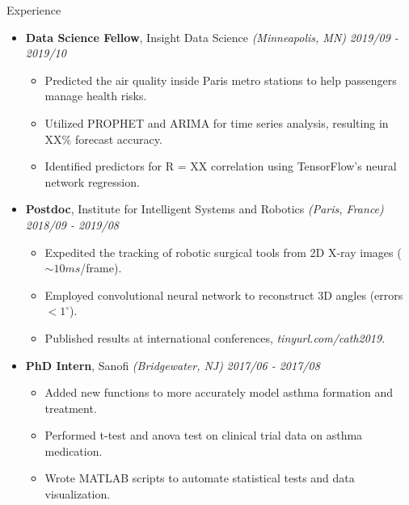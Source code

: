 \documentclass{resume} %
\begin{document}

\begin{rSection}{Experience}
	
	\begin{itemize}
	\item {\bf Data Science Fellow}{, Insight Data Science \textit{(Minneapolis, MN)}} \hfill {\em 2019/09 - 2019/10}\\
	\vspace{-5mm}
	\begin{itemize}
		\setlength\itemsep{-1.75em}
		\item Predicted the air quality inside Paris metro stations to help passengers manage health risks.\\
		\item Utilized PROPHET and ARIMA for time series analysis, resulting in XX\% forecast accuracy.\\
		\item Identified predictors for R = XX correlation using TensorFlow's neural network regression.
	\end{itemize}	
	
	\item {\bf Postdoc}{, Institute for Intelligent Systems and Robotics \textit{(Paris, France)}} \hfill {\em 2018/09 - 2019/08}\\
	\vspace{-5mm}
	\begin{itemize}
		\setlength\itemsep{-1.75em}
		\item  Expedited the tracking of robotic surgical tools from 2D X-ray images ($\sim 10 ms$/frame).\\ 
		\item  Employed convolutional neural network to reconstruct 3D angles (errors $< 1 ^\circ$).\\
		\item  Published results at international conferences, \textit{tinyurl.com/cath2019}.
	\end{itemize}
	
	\item {\bf PhD Intern}{, Sanofi \textit{(Bridgewater, NJ)}} \hfill {\em 2017/06 - 2017/08}\\
	\vspace{-5mm}
	\begin{itemize}
		\setlength\itemsep{-1.75em}	
		\item Added new functions to more accurately model asthma formation and treatment.\\
		\item Performed t-test and anova test on clinical trial data on asthma medication.\\ 
		\item Wrote MATLAB scripts to automate statistical tests and data visualization.
	\end{itemize}


\end{itemize}
\end{rSection}
\end{document}
